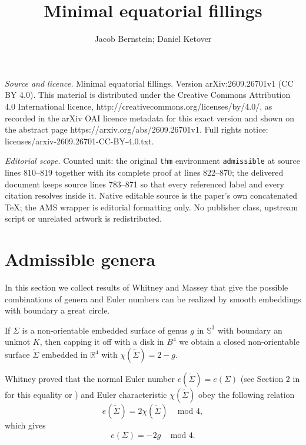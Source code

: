 \documentclass[10pt,a4paper]{amsart}
\numberwithin{equation}{section}
\begin{document}
\title[Minimal equatorial fillings]{Minimal equatorial fillings}
\author{Jacob Bernstein; Daniel Ketover}
\date{}
\maketitle
\noindent\emph{Source and licence.} Minimal equatorial fillings. Version arXiv:2609.26701v1 (CC BY 4.0). This material is distributed under the Creative Commons Attribution 4.0 International licence, http://creativecommons.org/licenses/by/4.0/, as recorded in the arXiv OAI licence metadata for this exact version and shown on the abstract page https://arxiv.org/abs/2609.26701v1. Full rights notice: licenses/arxiv-2609.26701-CC-BY-4.0.txt.\par\smallskip
\noindent\textit{Editorial scope.} Counted unit: the original \texttt{thm} environment \texttt{admissible} at source lines 810--819 together with its complete proof at lines 822--870; the delivered document keeps source lines 783--871 so that every referenced label and every citation resolves inside it. Native editable source is the paper's own concatenated TeX; the AMS wrapper is editorial formatting only. No publisher class, upstream script or unrelated artwork is redistributed.
\section{Admissible genera}\label{admissiblesection}
In this section we collect results of Whitney and Massey that give the possible combinations of genera and Euler numbers can be realized by smooth embeddings with boundary a great circle. 

If $\Sigma$ is a non-orientable embedded surface of genus $g$ in $\mathbb{S}^3$ with boundary an unknot $K$, then capping it off with a disk in $B^4$ we obtain a closed non-orientable surface $\tilde{\Sigma}$ embedded in $\mathbb{R}^4$ with  $\chi(\tilde{\Sigma})=2-g$.  

Whitney \cite{Whitney} proved that the normal Euler number $e(\tilde{\Sigma})=e(\Sigma)$ (see Section 2 in \cite{Conway} for this equality or \cite[1.1.1]{Yasuhara}) and Euler characteristic $\chi(\tilde{\Sigma})$ obey the following relation 
\begin{equation}
e(\tilde{\Sigma})=2\chi(\tilde{\Sigma}) \;\;\;\mbox{   mod } 4, 
\end{equation}
which gives
\begin{equation}
e(\Sigma)=-2g \;\;\;\mbox{   mod } 4.
\end{equation}
\end{document}

